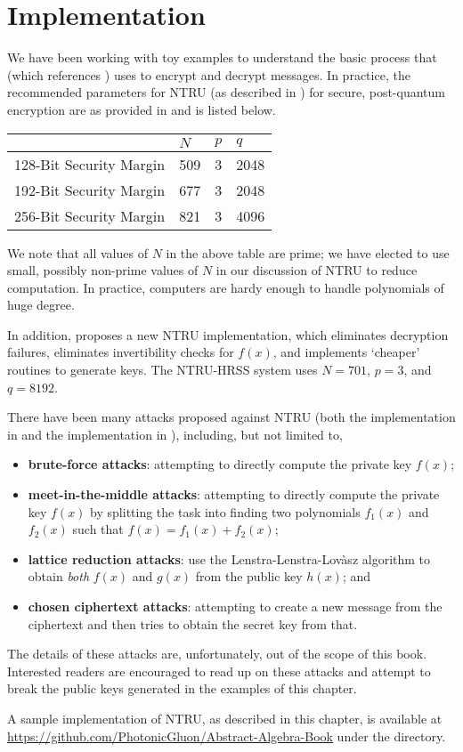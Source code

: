 \newpage

\section{Implementation}
We have been working with toy examples to understand the basic process that \cite{hoffstein_pipher_silverman_1998} (which references \cite{hoffstein_pipher_silverman_1996}) uses to encrypt and decrypt messages. In practice, the recommended parameters for NTRU (as described in \cite{hoffstein_pipher_silverman_1998}) for secure, post-quantum encryption are as provided in \cite{ntru_2020} and is listed below.
\begin{table}[H]
    \centering
    \begin{tabular}{|l|l|l|l|}
        \hline
        & $N$ & $p$ & $q$ \\ \hline
        128-Bit Security Margin & 509 & 3 & 2048 \\ \hline
        192-Bit Security Margin & 677 & 3 & 2048 \\ \hline
        256-Bit Security Margin & 821 & 3 & 4096 \\ \hline
    \end{tabular}
\end{table}

We note that all values of $N$ in the above table are prime; we have elected to use small, possibly non-prime values of $N$ in our discussion of NTRU to reduce computation. In practice, computers are hardy enough to handle polynomials of huge degree.

In addition, \cite{hulsing_rijneveld_schanck_schwabe_2018} proposes a new NTRU implementation, which eliminates decryption failures, eliminates invertibility checks for $f(x)$, and implements `cheaper' routines to generate keys. The NTRU-HRSS system uses $N = 701$, $p = 3$, and $q = 8192$.

There have been many attacks proposed against NTRU (both the implementation in \cite{hoffstein_pipher_silverman_1996} and the implementation in \cite{hulsing_rijneveld_schanck_schwabe_2018}), including, but not limited to,
\begin{itemize}
    \item \textbf{brute-force attacks}: attempting to directly compute the private key $f(x)$;
    \item \textbf{meet-in-the-middle attacks}: attempting to directly compute the private key $f(x)$ by splitting the task into finding two polynomials $f_1(x)$ and $f_2(x)$ such that $f(x) = f_1(x) + f_2(x)$;
    \item \textbf{lattice reduction attacks}: use the Lenstra-Lenstra-Lov\`asz algorithm to obtain \textit{both} $f(x)$ and $g(x)$ from the public key $h(x)$; and
    \item \textbf{chosen ciphertext attacks}: attempting to create a new message from the ciphertext and then tries to obtain the secret key from that.
\end{itemize}
The details of these attacks are, unfortunately, out of the scope of this book. Interested readers are encouraged to read up on these attacks and attempt to break the public keys generated in the examples of this chapter.

A sample implementation of NTRU, as described in this chapter, is available at \url{https://github.com/PhotonicGluon/Abstract-Algebra-Book} under the  directory.
